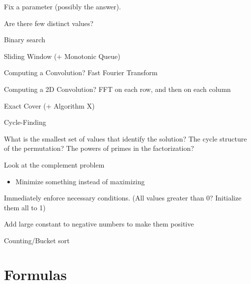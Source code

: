 \begin{myitemize}
      \item Fix a parameter (possibly the answer).
      \item Are there few distinct values?
      \item Binary search
      \item Sliding Window (+ Monotonic Queue)
      \item Computing a Convolution? Fast Fourier Transform
      \item Computing a 2D Convolution? FFT on each row, and then on each column
      \item Exact Cover (+ Algorithm X)
      \item Cycle-Finding
      \item What is the smallest set of values that identify the solution? The cycle structure of the permutation? The powers of primes in the factorization?
      \item Look at the complement problem
        \begin{itemize}
          \item Minimize something instead of maximizing
        \end{itemize}
      \item Immediately enforce necessary conditions. (All values greater than 0? Initialize them all to 1)
      \item Add large constant to negative numbers to make them positive
      \item Counting/Bucket sort
    \end{myitemize}

\section{Formulas}




